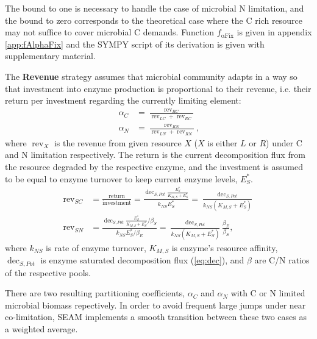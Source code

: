 \noindent
The bound to one is necessary to handle the case of microbial N
limitation, and the bound to zero corresponds to the theoretical case where the
C rich resource may not suffice to cover microbial C demands. 
Function $f_{\operatorname{{\alpha}Fix}}$ is given in appendix
\ref{app:fAlphaFix} and the SYMPY script of its 
derivation is given with supplementary material. 

The \textbf{Revenue} strategy assumes that microbial community adapts in a way
so that investment into enzyme production is proportional to their revenue, i.e.
their return per investment regarding the currently limiting element: 
\begin{subequations}
\label{eq:allocRev}
\begin{align}
\alpha_C &= \frac{\operatorname{rev}_{RC}}{\operatorname{rev}_{LC} + \operatorname{rev}_{RC}} 
\\
\alpha_N &= \frac{\operatorname{rev}_{RN}}{\operatorname{rev}_{LN} + \operatorname{rev}_{RN}} 
\text{,} 
\end{align}
\end{subequations}
where $\operatorname{rev}_X$ is the revenue from given resource $X$ ($X$ is
either $L$ or $R$) under C and N limitation respectively. The return is the
current decomposition flux from the resource degraded by the respective enzyme,
and the investment is assumed to be equal to enzyme turnover to keep current enzyme levels, $E_S^*$.
\begin{subequations}
\label{eq:allocRev2}
\begin{align}
\operatorname{rev}_{SC} &= \frac{\text{return}}{\text{investment}} 
= \frac{\operatorname{dec}_{S,Pot} \frac{E_S^*}{K_{M,S} + E_S^*}} {k_{NS}E_S^*} 
= \frac{\operatorname{dec}_{S,Pot}} {k_{NS}(K_{M,S} + E_S^*)} \\ 
\operatorname{rev}_{SN} &= \frac{\operatorname{dec}_{S,Pot}
\frac{E_S^*}{K_{M,S} + E_S^*} / \beta_S} {k_{NS} E_S^* / \beta_E} 
= \frac{\operatorname{dec}_{S,Pot}}{k_{NS} (K_{M,S} + E_S^*)} 
\frac{\beta_E}{\beta_S}
\text{,} 
\end{align}
\end{subequations}
where $k_{NS}$ is rate of enzyme turnover, $K_{M,S}$ is enzyme's resource
affinity, $\operatorname{dec}_{S,Pot}$ is
enzyme saturated decomposition flux (\ref{eq:dec}), and $\beta$ are C/N ratios
of the respective pools.

There are two resulting partitioning coefficients, $\alpha_C$ and $\alpha_N$
with C or N limited microbial biomass repectively. In order to avoid frequent large jumps
under near co-limitation, SEAM implements a smooth transition between these two
cases as a weighted average.

